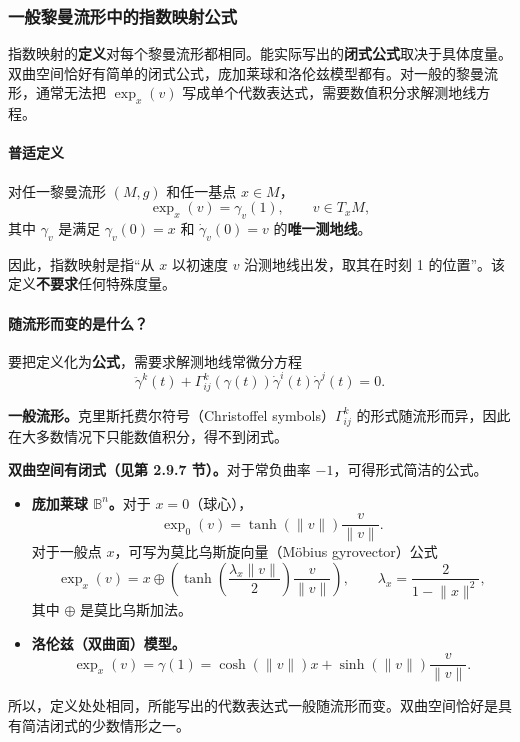 \subsubsection{一般黎曼流形中的指数映射公式}
指数映射的\textbf{定义}对每个黎曼流形都相同。能实际写出的\textbf{闭式公式}取决于具体度量。双曲空间恰好有简单的闭式公式，庞加莱球和洛伦兹模型都有。对一般的黎曼流形，通常无法把 $\exp_x(v)$ 写成单个代数表达式，需要数值积分求解测地线方程。

\paragraph{普适定义}
对任一黎曼流形 $(M,g)$ 和任一基点 $x\in M$，
\[
  \exp_x(v)=\gamma_v(1),\qquad v\in T_xM,
\]
其中 $\gamma_v$ 是满足 $\gamma_v(0)=x$ 和 $\dot\gamma_v(0)=v$ 的\textbf{唯一测地线}。

因此，指数映射是指“从 $x$ 以初速度 $v$ 沿测地线出发，取其在时刻 1 的位置”。该定义\textbf{不要求}任何特殊度量。

\paragraph{随流形而变的是什么？}
要把定义化为\textbf{公式}，需要求解测地线常微分方程
\[
  \ddot\gamma^k(t)+\Gamma^k_{ij}(\gamma(t))\dot\gamma^i(t)\dot\gamma^j(t)=0.
\]

\textbf{一般流形。}克里斯托费尔符号（Christoffel symbols）$\Gamma^k_{ij}$ 的形式随流形而异，因此在大多数情况下只能数值积分，得不到闭式。

\textbf{双曲空间有闭式（见第 2.9.7 节）。}对于常负曲率 $-1$，可得形式简洁的公式。
\begin{itemize}
  \item \textbf{庞加莱球 $\mathbb B^n$。}对于 $x=0$（球心），
    \[
      \exp_0(v)=\tanh(\lVert v\rVert)\frac{v}{\lVert v\rVert}.
    \]
    对于一般点 $x$，可写为莫比乌斯旋向量（Möbius gyrovector）公式
    \[
      \exp_x(v)=x\oplus\left(
       \tanh\left(\frac{\lambda_x\lVert v\rVert}{2}\right)
                \frac{v}{\lVert v\rVert}\right),\qquad
      \lambda_x=\frac{2}{1-\lVert x\rVert^2},
    \]
    其中 $\oplus$ 是莫比乌斯加法。
  \item \textbf{洛伦兹（双曲面）模型。}
    \[
      \exp_x(v)=\gamma(1)=\cosh(\lVert v\rVert)x+
             \sinh(\lVert v\rVert)\frac{v}{\lVert v\rVert}.
    \]
\end{itemize}
所以，定义处处相同，所能写出的代数表达式一般随流形而变。双曲空间恰好是具有简洁闭式的少数情形之一。

